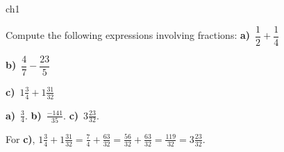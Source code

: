 {\begin{problems}{ch1}

	\begin{problem} 
		Compute the following expressions involving fractions:
		\threecol
			\textbf{a)}~$\dfrac{1}{2} + \dfrac{1}{4}$
			
			\textbf{b)}~$\dfrac{4}{7} - \dfrac{23}{5}$
			
			\textbf{c)}~$1\frac{3}{4} + 1\frac{31}{32}$
		\endthreecol
		\begin{answer}\textbf{a)}~$\frac{3}{4}$.
					\textbf{b)}~$\frac{-141}{35}$.
					\textbf{c)}~$3\frac{23}{32}$.\end{answer}
		\begin{solution}
			For \textbf{c)}, 
			$1\frac{3}{4} + 1\frac{31}{32} 
				= \frac{7}{4} + \frac{63}{32} 
				= \frac{56}{32} + \frac{63}{32} = \frac{119}{32}=3\frac{23}{32}$.
		\end{solution}
	\end{problem}

	
\end{problems}


} %




